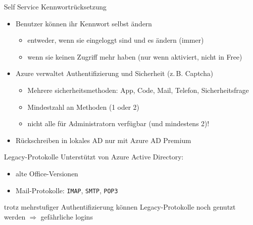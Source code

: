 

\begin{flashcard}[Definition]{Self Service Kennwortrücksetzung}
    \begin{itemize}
        \item Benutzer können ihr Kennwort selbst ändern
            \begin{itemize}
                \item entweder, wenn sie eingeloggt sind und es ändern (immer)
                \item wenn sie keinen Zugriff mehr haben (nur wenn aktiviert, nicht in Free)
            \end{itemize}
        \item Azure verwaltet Authentifizierung und Sicherheit (z.\,B. Captcha)
            \begin{itemize}
                \item Mehrere sicherheitsmethoden: App, Code, Mail, Telefon, Sicherheitsfrage
                \item Mindestzahl an Methoden (1 oder 2)
                \item nicht alle für Administratorn verfügbar (und mindestens 2)!
            \end{itemize}
        \item Rückschreiben in lokales AD nur mit Azure AD Premium
    \end{itemize}
\end{flashcard}


\begin{flashcard}[Definition]{Legacy-Protokolle}
    Unterstützt von Azure Active Directory:
    \begin{itemize}
        \item alte Office-Versionen
        \item Mail-Protokolle: \texttt{IMAP}, \texttt{SMTP}, \texttt{POP3}
    \end{itemize}
    \vspace{1cm}
    trotz mehrstufiger Authentifizierung können Legacy-Protokolle noch genutzt werden\newline
    $\Rightarrow$ gefährliche logins
\end{flashcard}

